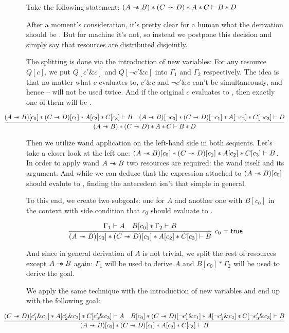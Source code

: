 Take the following statement:
\((A \mathrel{-\mkern-6mu*} B) * (C \mathrel{-\mkern-6mu*} D) * A * C \vdash B * D\)

After a moment's consideration, it's pretty clear for a human what the derivation should be .
But for machine it's not, so instead we postpone this decision and simply say that resources are distributed disjointly.

The splitting is done via the introduction of new variables:
For any resource \(Q[c]\), we put \(Q[c' \& c]\) and \(Q[\neg c' \& c]\) into \(\Gamma_1\) and \(\Gamma_2\) respectively.
The idea is that no matter what \(c\) evaluates to, \(c' \& c\) and \(\neg c' \& c\) can't be \true simultaneously, and hence -- will not be used twice.
And if the original \(c\) evaluates to \true, then exactly one of them will be \true.

\hspace{-0.1\linewidth}
\begin{minipage}[t]{1.2\linewidth}
\[
\hspace{-0.1\linewidth}
\infer{(A \wand B) \ast (C \wand D) \ast A \ast C \vdash B \ast D}
      {(A \wand B)[c_0] \ast (C \wand D)[c_1] \ast A[c_2] \ast C[c_3] \vdash B
       &
       (A \wand B)[\neg c_0] \ast (C \wand D)[\neg c_1] \ast A[\neg c_2] \ast C[\neg c_3] \vdash D}
\]
\end{minipage}

Then we utilize wand application on the left-hand side in both sequents.
Let's take a closer look at the left one: \((A \mathrel{-\mkern-6mu*} B)[c_0] \ast (C \mathrel{-\mkern-6mu*} D)[c_1] \ast A[c_2] \ast C[c_3] \vdash B\).
In order to apply wand \(A \mathrel{-\mkern-6mu*} B\) two resources are required: the wand itself and its argument.
And while we can deduce that the expression attached to \((A \mathrel{-\mkern-6mu*} B)[c_0]\) should evalute to \true, finding the antecedent isn't that simple in general.

To this end, we create two subgoals: one for \(A\) and another one with \(B[c_0]\) in the context with side condition that \(c_0\) should evaluate to \true.

\[
\infer[c_0 = \true]
      {(A \wand B)[c_0] \ast (C \wand D)[c_1] \ast
        A[c_2] \ast C[c_3] \vdash B}
      { \Gamma_1 \vdash A
       &
       B[c_0] \ast \Gamma_2 \vdash B}
\]

And since in general derivation of \(A\) is not trivial, we split the rest of resources except \(A \mathrel{-\mkern-6mu*} B\) again: \(\Gamma_1\) will be used to derive \(A\) and \(B[c_0] \ast \Gamma_2\) will be used to derive the goal.

We apply the same technique with the introduction of new variables and end up with the following goal:\\
\hspace{-0.1\linewidth}
\begin{minipage}[t]{1.2\linewidth}
\[
\hspace{-0.1\linewidth}
\infer{(A \wand B)[c_0] \ast (C \wand D)[c_1] \ast
        A[c_2] \ast C[c_3] \vdash B}
      {(C \wand D)[c'_1 \& c_1] \ast
       A[c'_2 \& c_2] \ast C[c'_3 \& c_3] \vdash A
       &
       B[c_0] \ast (C \wand D)[\neg c'_1 \& c_1] \ast
       A[\neg c'_1 \& c_2] \ast C[\neg c'_3 \& c_3] \vdash B}
\]
\end{minipage}

